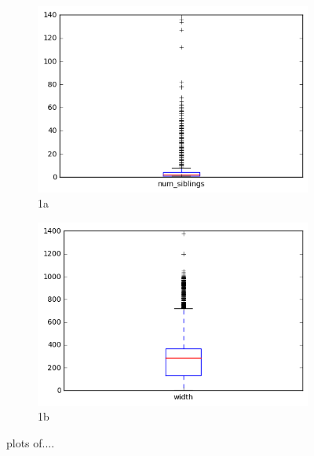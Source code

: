 \begin{figure}[h]
\begin{subfigure}{.5\textwidth}
  \centering
  \includegraphics[width=.8\linewidth]{figures06/boxplot_num_siblings}
  \caption{1a}
  \label{fig:boxsibl}
\end{subfigure}%
\begin{subfigure}{.5\textwidth}
  \centering
  \includegraphics[width=.8\linewidth]{figures06/boxplot_width}
  \caption{1b}
  \label{fig:sfig2}
\end{subfigure}
\caption{plots of....}
\label{fig:boxwidth}
\end{figure}


